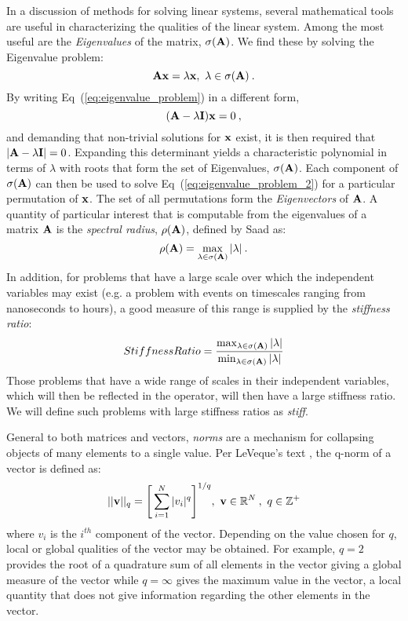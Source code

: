 In a discussion of methods for solving linear systems, several
mathematical tools are useful in characterizing the qualities of the
linear system. Among the most useful are the \textit{Eigenvalues} of
the matrix, $\sigma(\mathbf{A})$. We find these by solving the Eigenvalue
problem:
\begin{equation}
  \mathbf{A} \mathbf{x} = \lambda \mathbf{x},\ \lambda \in \sigma(\mathbf{A})\:.
  \label{eq:eigenvalue_problem}
\end{equation}
By writing Eq~(\ref{eq:eigenvalue_problem}) in a different form,
\begin{equation}
  (\mathbf{A} - \lambda \mathbf{I})\mathbf{x} = 0 \:,
  \label{eq:eigenvalue_problem_2}
\end{equation}
and demanding that non-trivial solutions for $\mathbf{x}$ exist, it is
then required that $|\mathbf{A} - \lambda \mathbf{I}| = 0$. Expanding this
determinant yields a characteristic polynomial in terms of $\lambda$
with roots that form the set of Eigenvalues, $\sigma(\mathbf{A})$. Each
component of $\sigma(\mathbf{A})$ can then be used to solve
Eq~(\ref{eq:eigenvalue_problem_2}) for a particular permutation of
$\mathbf{x}$. The set of all permutations form the \textit{Eigenvectors}
of $\mathbf{A}$. A quantity of particular interest that is computable
from the eigenvalues of a matrix $\mathbf{A}$ is the \textit{spectral
  radius}, $\rho(\mathbf{A})$, defined by Saad \citep{saad_iterative_2003}
as:
\begin{equation}
  \rho(\mathbf{A}) = \max_{\lambda \in \sigma(\mathbf{A})} |\lambda| \:.
  \label{eq:spectral_radius}
\end{equation}
In addition, for problems that have a large scale over which the
independent variables may exist (e.g. a problem with events on
timescales ranging from nanoseconds to hours), a good measure of this
range is supplied by the \textit{stiffness ratio}:
\begin{equation}
  Stiffness Ratio = \frac{\max_{\lambda \in \sigma(\mathbf{A})}
    |\lambda|}{\min_{\lambda \in \sigma(\mathbf{A})} |\lambda|}
\end{equation}
Those problems that have a wide range of scales in their independent
variables, which will then be reflected in the operator, will then
have a large stiffness ratio. We will define such problems with large
stiffness ratios as \textit{stiff}.

General to both matrices and vectors, \textit{norms} are a mechanism
for collapsing objects of many elements to a single value. Per
LeVeque's text \citep{leveque_finite_2007}, the q-norm of a vector is defined
as:
\begin{equation}
  ||\mathbf{v}||_q = \Bigg[ \sum_{i=1}^N |v_i|^q \Bigg]^{1/q},\ \mathbf{v} \in
  \mathbb{R}^N\:,\ q \in \mathbb{Z}^+
  \label{eq:q_norm}
\end{equation}
where ${v_i}$ is the $i^{th}$ component of the vector. Depending on
the value chosen for $q$, local or global qualities of the vector may
be obtained. For example, $q=2$ provides the root of a quadrature sum
of all elements in the vector giving a global measure of the vector
while $q=\infty$ gives the maximum value in the vector, a local
quantity that does not give information regarding the other elements
in the vector.

